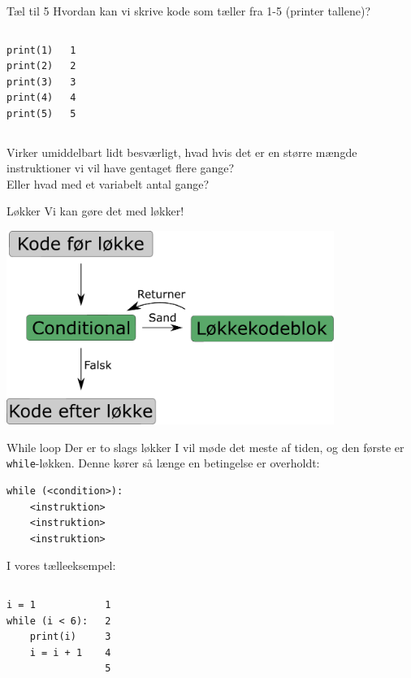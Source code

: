 \begin{frame}[fragile]{Tæl til 5}
	Hvordan kan vi skrive kode som tæller fra 1-5 (printer tallene)?
	\pause
	\begin{columns}
		\begin{lstlisting}[style=python]
print(1)
print(2)
print(3)
print(4)
print(5)
		\end{lstlisting}
		\begin{lstlisting}[style=python]
1
2
3
4
5
		\end{lstlisting}
	\end{columns}
	Virker umiddelbart lidt besværligt, hvad hvis det er en større mængde instruktioner vi vil have gentaget flere gange?\\
	Eller hvad med et variabelt antal gange?
\end{frame}

\begin{frame}[fragile]{Løkker}
	Vi kan gøre det med løkker!
	\begin{center}
		\includegraphics[width=0.8\textwidth]{figs/loop.pdf}
	\end{center}
\end{frame}

%
\begin{frame}[fragile]{While loop}
Der er to slags løkker I vil møde det meste af tiden, og den første er \texttt{while}-løkken. Denne kører så længe en betingelse er overholdt:
\begin{lstlisting}[style=python]
while (<condition>):
	<instruktion>
	<instruktion>
	<instruktion>
\end{lstlisting}
I vores tælleeksempel:
\begin{columns}
	\column{0.4\textwidth}
	\begin{lstlisting}[style=python]
i = 1
while (i < 6):
	print(i)
	i = i + 1
	\end{lstlisting}
	\column{0.4\textwidth}
	\begin{lstlisting}[style=python]
1
2
3
4
5
	\end{lstlisting}
\end{columns}
\end{frame}

